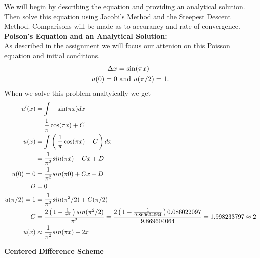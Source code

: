 \documentclass[12pt,a4paper]{report}
\begin{document}
	We will begin by describing the equation and providing an analytical solution.  Then solve this equation using Jacobi's Method and the Steepest Descent Method.  Comparisons will be made as to accurancy and rate of convergence.\\
	
\noindent\textbf{Poison's Equation and an Analytical Solution:}\\

As described in the assignment we will focus our attenion on this Poisson equation and initial conditions.
\begin{align*}
	-\Delta x &= \sin(\pi x)\\
	u(0) = 0 &\text{ and } u(\pi/2)=1.
\end{align*}When we solve this problem analtyically we get
\begin{align*}
	u'(x) &= \int -\sin(\pi x) dx \\
	&= \frac{1}{\pi}\cos(\pi x)+C \\
	u(x) &= \int \left (\, \frac{1}{\pi}\cos(\pi x)+C \,\right ) dx \\
	&= \frac{1}{\pi^2}sin(\pi x) + Cx + D \\
	u(0) = 0 &= \frac{1}{\pi^2}sin(\pi 0) + Cx + D \\
	D &= 0 \\
	u(\pi/2) =1 &= \frac{1}{\pi^2}sin(\pi^2/2) + C(\pi/2) \\
	C &= \frac{2\left (\, 1-\frac{1}{\pi^2} \,\right )sin(\pi^2/2)}{\pi^2}=\frac{2\left (\, 1-\frac{1}{9.869604064} \,\right )0.086022097}{9.869604064} = 1.998233797 \approx 2 \\
	u(x) &\approx \frac{1}{\pi^2}sin(\pi x) + 2x \\
\end{align*}

\noindent\textbf{Centered Difference Scheme}\\
\end{document}
